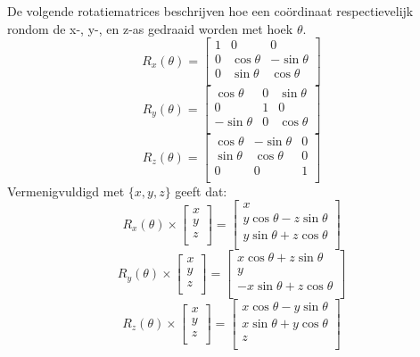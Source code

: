 \documentclass[12pt, a4paper]{article}
\begin{document}
De volgende rotatiematrices beschrijven hoe een coördinaat respectievelijk rondom de x-, y-, en z-as gedraaid worden met hoek $\theta$.
\[
R_x(\theta) = \begin{bmatrix}
1 &  0            &  0           \\
0 &  \cos \theta  & -\sin \theta \\
0 &  \sin \theta & \cos \theta \\
\end{bmatrix}
\]
\[
R_y(\theta) = \begin{bmatrix}
\cos \theta & 0 & \sin \theta \\
0           & 1 &  0           \\
-\sin \theta & 0 &  \cos \theta \\
\end{bmatrix}
\]
\[
R_z(\theta) = \begin{bmatrix}
\cos \theta & -\sin \theta & 0 \\
\sin \theta &  \cos \theta & 0 \\
0           &  0           & 1 \\
\end{bmatrix}
\]
Vermenigvuldigd met $\{x,y,z\}$ geeft dat:
\[
R_x(\theta)\times
\begin{bmatrix} x \\ y \\ z \\ \end{bmatrix}=
\begin{bmatrix}
x \\
y \cos \theta - z \sin \theta \\
y \sin \theta + z \cos \theta \\
\end{bmatrix} 
\]
\[
R_y(\theta)\times
\begin{bmatrix} x \\ y \\ z \\ \end{bmatrix}=
\begin{bmatrix}
x \cos \theta + z \sin \theta \\
y \\
-x \sin \theta + z \cos \theta \\
\end{bmatrix} 
\]
\[
R_z(\theta) \times
\begin{bmatrix} x \\ y \\ z \\ \end{bmatrix}=
\begin{bmatrix}
x \cos \theta - y \sin \theta \\
x \sin \theta + y \cos \theta \\
z \\
\end{bmatrix} 
\]
\end{document}
